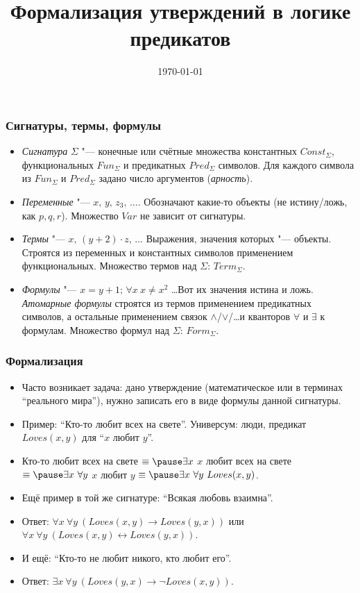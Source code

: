 \documentclass[10pt]{beamer}
\title{Формализация утверждений в логике предикатов}
\date{\today}
\begin{document}
\begin{frame}[plain]
    \maketitle
\end{frame}

\begin{frame}
    \frametitle{Сигнатуры, термы, формулы}
    \begin{itemize}
        \item \emph{Сигнатура} $\Sigma$ "--- конечные или счётные множества константных $Const_\Sigma$, функциональных $Fun_\Sigma$ и предикатных $Pred_\Sigma$ символов. Для каждого символа из $Fun_\Sigma$ и $Pred_\Sigma$ задано число аргументов (\emph{арность}).
        \item \emph{Переменные} "--- \pause $x,\,y,\,z_3,\,\ldots$. Обозначают \pause какие-то объекты (не истину/ложь, как $p,q,r$). Множество $Var$ не зависит от сигнатуры. \pause
        \item \emph{Термы} "--- \pause $x,\,(y+2) \cdot z,\,\ldots$ Выражения, значения которых "--- объекты. Строятся из переменных и константных символов применением функциональных. Множество термов над $\Sigma$: $Term_\Sigma$. \pause
        \item \emph{Формулы} "--- \pause $x=y+1$; $\forall x ~ x \neq x^2$ \ldots Вот их значения истина и ложь. \emph{Атомарные формулы} строятся из термов применением предикатных символов, а остальные  применением связок $\land$/$\lor$/\ldots и кванторов $\forall$ и $\exists$ к формулам. Множество формул над $\Sigma$: $Form_\Sigma$.
    \end{itemize}
\end{frame}

\begin{frame}
    \frametitle{Формализация}
    \begin{itemize}
        \item Часто возникает задача: дано утверждение (математическое или в терминах \enquote{реального мира}), нужно записать его в виде формулы данной сигнатуры.
        \item Пример: \enquote{Кто-то любит всех на свете}. Универсум: люди, предикат $Loves(x, y)$ для \enquote{$x$ любит $y$}.
        \item Кто-то любит всех на свете $\equiv \pause \exists x $ $x$ любит всех на свете $\equiv \pause \exists x ~ \forall y $ $x$ любит $y$ $\equiv \pause \exists x ~ \forall y ~ Loves(x, y)$. \pause
        \item Ещё пример в той же сигнатуре: \enquote{Всякая любовь взаимна}.
        \item Ответ: \pause $\forall x ~ \forall y ~ (Loves(x, y) \to Loves(y,x))$ или \pause $\forall x ~ \forall y ~ (Loves(x, y) \leftrightarrow Loves(y,x))$. \pause
        \item И ещё: \enquote{Кто-то не любит никого, кто любит его}.
        \item Ответ: \pause $\exists x ~ \forall y ~ (Loves(y, x) \to \neg Loves(x,y))$.
    \end{itemize}
\end{frame}
\end{document}
